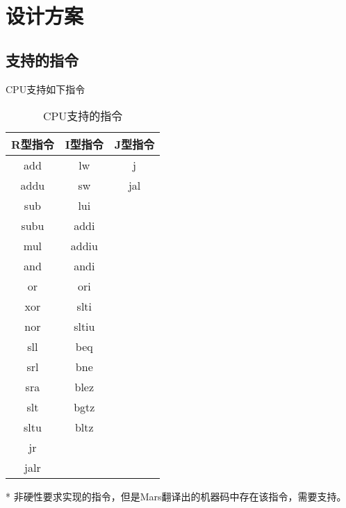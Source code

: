 \section{设计方案}

\subsection{支持的指令}
CPU支持如下指令
\begin{table}[H]
    \centering
    \begin{threeparttable}
    \begin{tabular}{ccc}
        \toprule
        R型指令 & I型指令 & J型指令 \\ 
        \midrule
        add  & lw    & j   \\
        addu & sw    & jal \\
        sub  & lui   &     \\
        subu & addi  &     \\
        mul  & addiu &     \\
        and  & andi  &     \\
        or   & ori\tnote{*} & \\
        xor  & slti  &     \\
        nor  & sltiu &     \\
        sll  & beq   &     \\
        srl  & bne   &     \\
        sra  & blez  &     \\
        slt  & bgtz  &     \\
        sltu & bltz  &     \\
        jr   &       &     \\
        jalr &       &     \\
        \bottomrule
    \end{tabular}
    \begin{tablenotes}
        \footnotesize
        \item[*] 非硬性要求实现的指令，但是Mars翻译出的机器码中存在该指令，需要支持。
    \end{tablenotes}
    \end{threeparttable}
    \caption{CPU支持的指令}
    \label{tab:supported-instruction}
\end{table}

